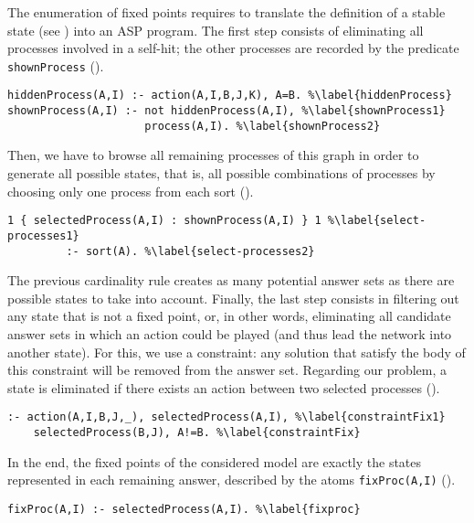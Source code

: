 The enumeration of fixed points requires to translate the definition of a stable state (see )
into an ASP program.
The first step consists of eliminating all processes involved in a self-hit;
the other processes are recorded by the predicate \texttt{shownProcess} ().
\begin{lstlisting}
hiddenProcess(A,I) :- action(A,I,B,J,K), A=B. %\label{hiddenProcess}
shownProcess(A,I) :- not hiddenProcess(A,I), %\label{shownProcess1}
                     process(A,I). %\label{shownProcess2}
\end{lstlisting}
Then, we have to browse all remaining processes of this graph in order to generate all possible states,
that is, all possible combinations of processes by choosing only one process from each sort ().
\begin{lstlisting}
1 { selectedProcess(A,I) : shownProcess(A,I) } 1 %\label{select-processes1}
         :- sort(A). %\label{select-processes2}
\end{lstlisting}
The previous cardinality rule creates as many potential answer sets as there are possible states
to take into account.
Finally, the last step consists in filtering out any state that is not a fixed point,
or, in other words, eliminating all candidate answer sets in which an action could be played (and thus lead the network into another state).
For this, we use a constraint:
any solution that satisfy the body of this constraint will be removed from the answer set.
Regarding our problem, a state is eliminated if there exists an action between two selected processes ().
\begin{lstlisting}
:- action(A,I,B,J,_), selectedProcess(A,I), %\label{constraintFix1}
    selectedProcess(B,J), A!=B. %\label{constraintFix}
\end{lstlisting}
In the end, the fixed points of the considered model are exactly the states represented in each remaining answer,
described by the atoms \texttt{fixProc(A,I)} ().
\begin{lstlisting}
fixProc(A,I) :- selectedProcess(A,I). %\label{fixproc}
\end{lstlisting}

